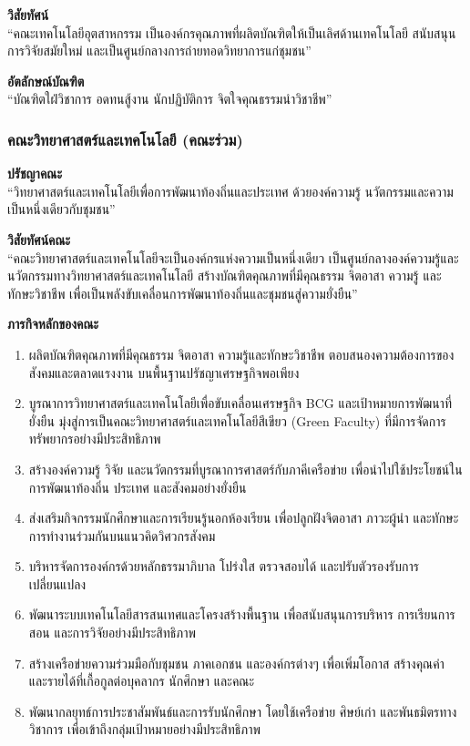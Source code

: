 \textbf{วิสัยทัศน์}\\
``คณะเทคโนโลยีอุตสาหกรรม เป็นองค์กรคุณภาพที่ผลิตบัณฑิตให้เป็นเลิศด้านเทคโนโลยี สนับสนุนการวิจัยสมัยใหม่ และเป็นศูนย์กลางการถ่ายทอดวิทยาการแก่ชุมชน''

\textbf{อัตลักษณ์บัณฑิต}\\
``บัณฑิตใฝ่วิชาการ อดทนสู้งาน นักปฏิบัติการ จิตใจคุณธรรมนำวิชาชีพ''

\vspace{6pt}
\subsubsection*{คณะวิทยาศาสตร์และเทคโนโลยี (คณะร่วม)}

\textbf{ปรัชญาคณะ}\\
``วิทยาศาสตร์และเทคโนโลยีเพื่อการพัฒนาท้องถิ่นและประเทศ ด้วยองค์ความรู้ นวัตกรรมและความเป็นหนึ่งเดียวกับชุมชน''

\textbf{วิสัยทัศน์คณะ}\\
``คณะวิทยาศาสตร์และเทคโนโลยีจะเป็นองค์กรแห่งความเป็นหนึ่งเดียว เป็นศูนย์กลางองค์ความรู้และนวัตกรรมทางวิทยาศาสตร์และเทคโนโลยี สร้างบัณฑิตคุณภาพที่มีคุณธรรม จิตอาสา ความรู้ และทักษะวิชาชีพ เพื่อเป็นพลังขับเคลื่อนการพัฒนาท้องถิ่นและชุมชนสู่ความยั่งยืน''

\textbf{ภารกิจหลักของคณะ}

\begin{enumerate}
  \item ผลิตบัณฑิตคุณภาพที่มีคุณธรรม จิตอาสา ความรู้และทักษะวิชาชีพ ตอบสนองความต้องการของสังคมและตลาดแรงงาน บนพื้นฐานปรัชญาเศรษฐกิจพอเพียง
  \item บูรณาการวิทยาศาสตร์และเทคโนโลยีเพื่อขับเคลื่อนเศรษฐกิจ BCG และเป้าหมายการพัฒนาที่ยั่งยืน มุ่งสู่การเป็นคณะวิทยาศาสตร์และเทคโนโลยีสีเขียว (Green Faculty) ที่มีการจัดการทรัพยากรอย่างมีประสิทธิภาพ
  \item สร้างองค์ความรู้ วิจัย และนวัตกรรมที่บูรณาการศาสตร์กับภาคีเครือข่าย เพื่อนำไปใช้ประโยชน์ในการพัฒนาท้องถิ่น ประเทศ และสังคมอย่างยั่งยืน
  \item ส่งเสริมกิจกรรมนักศึกษาและการเรียนรู้นอกห้องเรียน เพื่อปลูกฝังจิตอาสา ภาวะผู้นำ และทักษะการทำงานร่วมกันบนแนวคิดวิศวกรสังคม
  \item บริหารจัดการองค์กรด้วยหลักธรรมาภิบาล โปร่งใส ตรวจสอบได้ และปรับตัวรองรับการเปลี่ยนแปลง
  \item พัฒนาระบบเทคโนโลยีสารสนเทศและโครงสร้างพื้นฐาน เพื่อสนับสนุนการบริหาร การเรียนการสอน และการวิจัยอย่างมีประสิทธิภาพ
  \item สร้างเครือข่ายความร่วมมือกับชุมชน ภาคเอกชน และองค์กรต่างๆ เพื่อเพิ่มโอกาส สร้างคุณค่า และรายได้ที่เกื้อกูลต่อบุคลากร นักศึกษา และคณะ
  \item พัฒนากลยุทธ์การประชาสัมพันธ์และการรับนักศึกษา โดยใช้เครือข่าย ศิษย์เก่า และพันธมิตรทางวิชาการ เพื่อเข้าถึงกลุ่มเป้าหมายอย่างมีประสิทธิภาพ
\end{enumerate}

